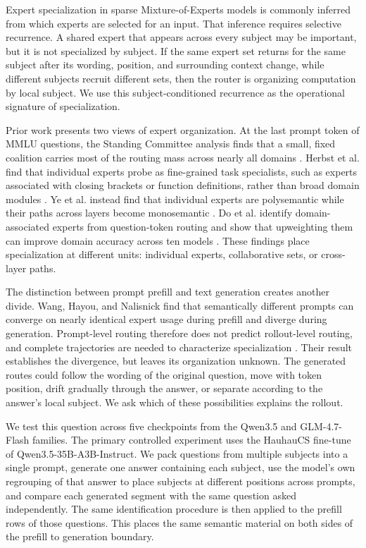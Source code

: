 Expert specialization in sparse Mixture-of-Experts models is commonly inferred from which experts are selected for an input. That inference requires selective recurrence. A shared expert that appears across every subject may be important, but it is not specialized by subject. If the same expert set returns for the same subject after its wording, position, and surrounding context change, while different subjects recruit different sets, then the router is organizing computation by local subject. We use this subject-conditioned recurrence as the operational signature of specialization.

Prior work presents two views of expert organization. At the last prompt token of MMLU questions, the Standing Committee analysis finds that a small, fixed coalition carries most of the routing mass across nearly all domains \citep{wang2026standingcommittee}. Herbst et al. find that individual experts probe as fine-grained task specialists, such as experts associated with closing brackets or function definitions, rather than broad domain modules \citep{herbst2026expertstrikesback}. Ye et al. instead find that individual experts are polysemantic while their paths across layers become monosemantic \citep{ye2026polysemantic}. Do et al. identify domain-associated experts from question-token routing and show that upweighting them can improve domain accuracy across ten models \citep{do2026domainexperts}. These findings place specialization at different units: individual experts, collaborative sets, or cross-layer paths.

The distinction between prompt prefill and text generation creates another divide. Wang, Hayou, and Nalisnick find that semantically different prompts can converge on nearly identical expert usage during prefill and diverge during generation. Prompt-level routing therefore does not predict rollout-level routing, and complete trajectories are needed to characterize specialization \citep{wang2026myth}. Their result establishes the divergence, but leaves its organization unknown. The generated routes could follow the wording of the original question, move with token position, drift gradually through the answer, or separate according to the answer's local subject. We ask which of these possibilities explains the rollout.

We test this question across five checkpoints from the Qwen3.5 and GLM-4.7-Flash families. The primary controlled experiment uses the HauhauCS fine-tune of Qwen3.5-35B-A3B-Instruct. We pack questions from multiple subjects into a single prompt, generate one answer containing each subject, use the model's own regrouping of that answer to place subjects at different positions across prompts, and compare each generated segment with the same question asked independently. The same identification procedure is then applied to the prefill rows of those questions. This places the same semantic material on both sides of the prefill to generation boundary.


